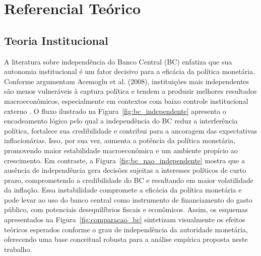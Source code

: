 \documentclass[a4paper,12pt]{article}
\begin{document}
\section*{\textbf{Referencial Teórico}}

\subsection*{\textbf{Teoria Institucional}}

A literatura sobre independência do Banco Central (BC) enfatiza que sua autonomia institucional é um fator decisivo para a eficácia da política monetária. Conforme argumentam Acemoglu et al. (2008), instituições mais independentes são menos vulneráveis à captura política e tendem a produzir melhores resultados macroeconômicos, especialmente em contextos com baixo controle institucional externo \cite{acemoglu2008}. O fluxo ilustrado na Figura~\ref{fig:bc_independente} apresenta o encadeamento lógico pelo qual a independência do BC reduz a interferência política, fortalece sua credibilidade e contribui para a ancoragem das expectativas inflacionárias. Isso, por sua vez, aumenta a potência da política monetária, promovendo maior estabilidade macroeconômica e um ambiente propício ao crescimento. Em contraste, a Figura~\ref{fig:bc_nao_independente} mostra que a ausência de independência gera decisões sujeitas a interesses políticos de curto prazo, comprometendo a credibilidade do BC e resultando em maior volatilidade da inflação. Essa instabilidade compromete a eficácia da política monetária e pode levar ao uso do banco central como instrumento de financiamento do gasto público, com potenciais desequilíbrios fiscais e econômicos. Assim, os esquemas apresentados na Figura~\ref{fig:comparacao_bc} sintetizam visualmente os efeitos teóricos esperados conforme o grau de independência da autoridade monetária, oferecendo uma base conceitual robusta para a análise empírica proposta neste trabalho.
\end{document}
